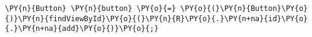 \begin{Verbatim}[commandchars=\\\{\}]
\PY{n}{Button} \PY{n}{button} \PY{o}{=} \PY{o}{(}\PY{n}{Button}\PY{o}{)}\PY{n}{findViewById}\PY{o}{(}\PY{n}{R}\PY{o}{.}\PY{n+na}{id}\PY{o}{.}\PY{n+na}{add}\PY{o}{)}\PY{o}{;}
\end{Verbatim}

